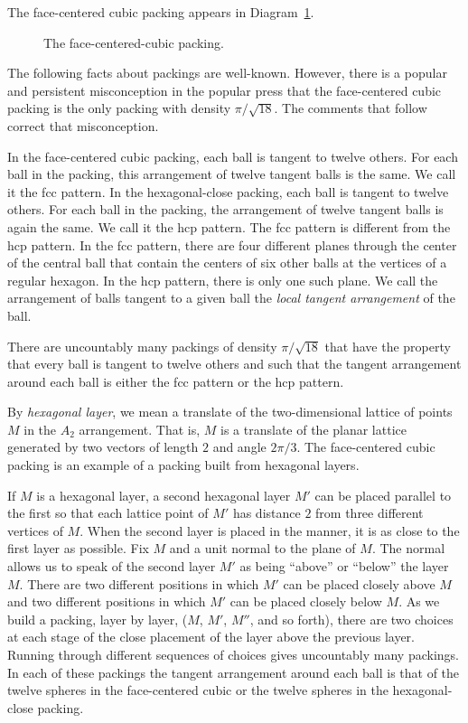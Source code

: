 The face-centered cubic packing appears in
Diagram~\ref{fig:fcc-pack}.

\begin{figure}[htb]
  \centering
  \caption{The face-centered-cubic packing.}
  \label{fig:fcc-pack}
\end{figure}

The following facts about packings are well-known.  However, there
is a popular and persistent misconception in the popular press
that the face-centered cubic packing is the only packing with
density $\pi/\sqrt{18}$. The comments that follow correct that
misconception.

In the face-centered cubic packing, each ball is tangent to twelve
others.  For each ball in the packing, this arrangement of twelve
tangent balls is the same.  We call it the fcc pattern. In the
hexagonal-close packing, each ball is tangent to twelve others.
For each ball in the packing, the arrangement of twelve tangent
balls is again the same.  We call it the hcp pattern.  The fcc
pattern is different from the hcp pattern.  In the fcc pattern,
there are four different planes through the center of the central
ball that contain the centers of six other balls at the vertices
of a regular hexagon.  In the hcp pattern, there is only one such
plane.  We call the arrangement of balls tangent to a given ball
the {\it local tangent arrangement} of the ball.

There are uncountably many packings of density $\pi/\sqrt{18}$
that have the property that every ball is tangent to twelve others
and such that the tangent arrangement around each ball is either
the fcc pattern or the hcp pattern.

By {\it hexagonal layer}, we mean a translate of the two-dimensional
lattice of points $M$ in the $A_2$ arrangement. That is, $M$ is a
translate of the planar lattice generated by two vectors of length
$2$ and angle $2\pi/3$.  The face-centered cubic packing is an
example of a packing built from hexagonal layers.

If $M$ is a hexagonal layer, a second hexagonal layer $M'$ can be
placed parallel to the first so that each lattice point of $M'$ has
distance $2$ from three different vertices of $M$.  When the second
layer is placed in the manner, it is as close to the first layer as
possible. Fix $M$ and a unit normal to the plane of $M$. The normal
allows us to speak of the second layer $M'$ as being ``above'' or
``below'' the layer $M$. There are two different positions in which
$M'$ can be placed closely above $M$ and two different positions in
which $M'$ can be placed closely below $M$. As we build a packing,
layer by layer, ($M$, $M'$, $M''$, and so forth), there are two
choices at each stage of the close placement of the layer above the
previous layer. Running through different sequences of choices gives
uncountably many packings.  In each of these packings the tangent
arrangement around each ball is that of the twelve spheres in the
face-centered cubic or the twelve spheres in the hexagonal-close
packing.

